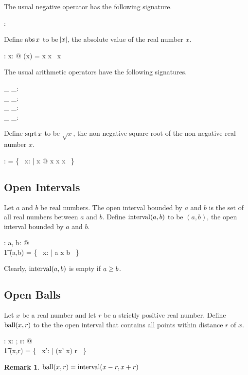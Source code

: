 \documentclass[11pt, oneside]{article}
\newtheorem*{remark}{Remark}
\begin{document}
The usual negative operator has the following signature.
\begin{axdef}
	\negR: \R \fun \R
\end{axdef}

Define $\operatorname{abs}{x}$ to be $\abs{x}$, the absolute value of the real number $x$.
\begin{axdef}
	\absR: \R \fun \R
\where
	\forall x: \R @ \absR(x) = \IF x \geR \zeroR \THEN x \ELSE \negR~x
\end{axdef}

The usual arithmetic operators have the following signatures.
\begin{axdef}
	\_ \addR \_: \R \cross \R \fun \R \\
	\_ \subR \_: \R \cross \R \fun \R \\
	\_ \mulR \_: \R \cross \R \fun \R \\
	\_ \divR \_: \R \cross \Rnz \fun \R
\end{axdef}

Define $\operatorname{sqrt}{x}$ to be $\sqrt{x}$, the non-negative square root of the non-negative real number $x$.
\begin{axdef}
	\sqrtR: \R \pfun \R
\where
	\sqrtR = \{~ x: \R | x \geR \zeroR @ x \mulR x \mapsto x ~\}
\end{axdef}

\subsection{Open Intervals}

Let $a$ and $b$ be real numbers.
The open interval bounded by $a$ and $b$ is the set of all real numbers between $a$ and $b$.
Define $\operatorname{interval}(a,b)$ to be $(a,b)$, the open interval bounded by $a$ and $b$. 

\begin{axdef}
	\intervalRR: \R \cross \R \fun \power \R
\where
	\forall a, b: \R @ \\
	\t1	\intervalRR(a,b) = \{~ x: \R | a \ltR x \ltR b ~\}
\end{axdef}
Clearly, $\operatorname{interval}(a,b)$ is empty if $a \mathrel{\geq} b$.

\subsection{Open Balls}
Let $x$ be a real number and let $r$ be a strictly positive real number.
Define $\operatorname{ball}(x,r)$ to the the open interval that contains all points within distance $r$ of $x$.
\begin{axdef}
	\ballRR: \R \cross \Rpos \fun \power \R
\where
	\forall x: \R; r: \Rpos @ \\
	\t1	\ballRR(x,r) = \{~ x': \R | \absR(x' \subR x) \ltR r ~\}
\end{axdef}
\begin{remark}
$\operatorname{ball}(x,r) = \operatorname{interval}(x-r, x+r)$
\end{remark}
\end{document}

